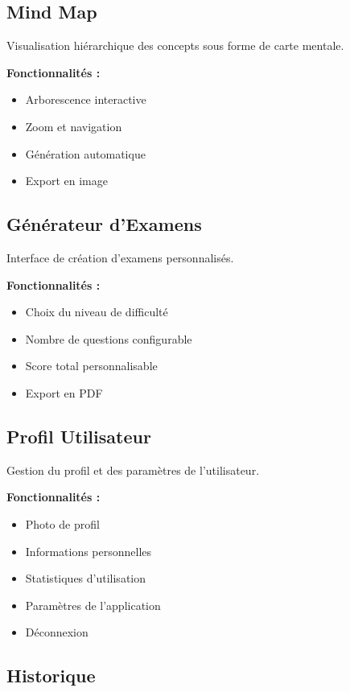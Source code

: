 \documentclass[12pt,a4paper]{report}
\begin{document}
\subsection{Mind Map}

Visualisation hiérarchique des concepts sous forme de carte mentale.

\textbf{Fonctionnalités :}
\begin{itemize}
    \item Arborescence interactive
    \item Zoom et navigation
    \item Génération automatique
    \item Export en image
\end{itemize}

\subsection{Générateur d'Examens}

Interface de création d'examens personnalisés.

\textbf{Fonctionnalités :}
\begin{itemize}
    \item Choix du niveau de difficulté
    \item Nombre de questions configurable
    \item Score total personnalisable
    \item Export en PDF
\end{itemize}

\subsection{Profil Utilisateur}

Gestion du profil et des paramètres de l'utilisateur.

\textbf{Fonctionnalités :}
\begin{itemize}
    \item Photo de profil
    \item Informations personnelles
    \item Statistiques d'utilisation
    \item Paramètres de l'application
    \item Déconnexion
\end{itemize}

\subsection{Historique}
\end{document}
